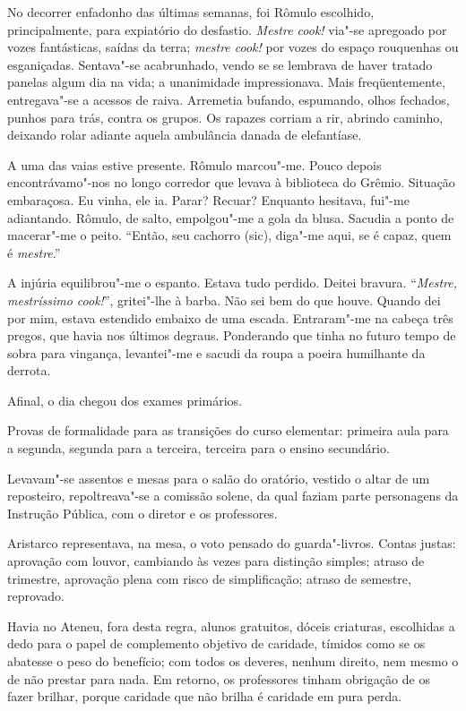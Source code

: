 No decorrer enfadonho das últimas semanas,
foi Rômulo escolhido, principalmente, para expiatório do desfastio.
\textit{Mestre cook!} via"-se apregoado por vozes fantásticas, saídas da terra;
\textit{mestre cook!} por vozes do espaço rouquenhas ou esganiçadas.
Sentava"-se acabrunhado, vendo se se lembrava de haver tratado panelas
algum dia na vida; a unanimidade impressionava. Mais freqüentemente,
entregava"-se a acessos de raiva. Arremetia bufando, espumando, olhos
fechados, punhos para trás, contra os grupos. Os rapazes corriam a rir,
abrindo caminho, deixando rolar adiante aquela ambulância danada de
elefantíase. 

A uma das vaias estive presente. Rômulo marcou"-me. Pouco
depois encontrávamo"-nos no longo corredor que levava à biblioteca do
Grêmio. Situação embaraçosa. Eu vinha, ele ia. Parar? Recuar? Enquanto
hesitava, fui"-me adiantando. Rômulo, de salto, empolgou"-me a gola
da blusa. Sacudia a ponto de macerar"-me o peito. ``Então, seu cachorro
(sic), diga"-me aqui, se é capaz, quem é \textit{mestre}.'' 

A injúria equilibrou"-me o espanto. Estava tudo perdido. Deitei bravura.
``\textit{Mestre, mestríssimo cook!}'', gritei"-lhe à barba. Não sei bem do que
houve. Quando dei por mim, estava estendido embaixo de uma escada.
Entraram"-me na cabeça três pregos, que havia nos últimos degraus.
Ponderando que tinha no futuro tempo de sobra para vingança,
levantei"-me e sacudi da roupa a poeira humilhante da derrota. 

Afinal, o dia chegou dos exames primários. 

Provas de formalidade para as
transições do curso elementar: primeira aula para a segunda, segunda
para a terceira, terceira para o ensino secundário. 

Levavam"-se assentos e mesas para o salão do oratório, vestido o altar de um
reposteiro, repoltreava"-se a comissão solene, da qual faziam parte
personagens da Instrução Pública, com o diretor e os professores.

Aristarco representava, na mesa, o voto pensado do guarda"-livros.
Contas justas: aprovação com louvor, cambiando às vezes para distinção
simples; atraso de trimestre, aprovação plena com risco de
simplificação; atraso de semestre, reprovado. 

Havia no Ateneu, fora
desta regra, alunos gratuitos, dóceis criaturas, escolhidas a dedo para
o papel de complemento objetivo de caridade, tímidos como se os
abatesse o peso do benefício; com todos os deveres, nenhum direito, nem
mesmo o de não prestar para nada. Em retorno, os professores tinham
obrigação de os fazer brilhar, porque caridade que não brilha é
caridade em pura perda. 

